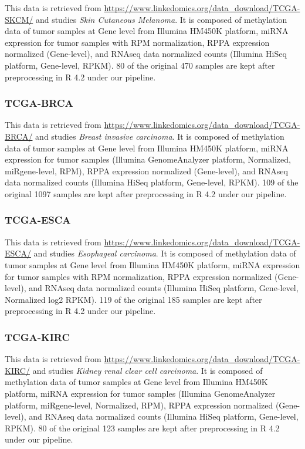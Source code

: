 \documentclass[
]{article}
\begin{document}
This data is retrieved from \url{https://www.linkedomics.org/data_download/TCGA-SKCM/} and studies \emph{Skin Cutaneous Melanoma}. It is composed of methylation data of tumor samples at Gene level from Illumina HM450K platform, miRNA expression for tumor samples with RPM normalization, RPPA expression normalized (Gene-level), and RNAseq data normalized counts (Illumina HiSeq platform, Gene-level, RPKM). 80 of the original 470 samples are kept after preprocessing in R 4.2 under our pipeline.

\hypertarget{tcga-brca}{%
\subsubsection{TCGA-BRCA}\label{tcga-brca}}

This data is retrieved from \url{https://www.linkedomics.org/data_download/TCGA-BRCA/} and studies \emph{Breast invasive carcinoma}. It is composed of methylation data of tumor samples at Gene level from Illumina HM450K platform, miRNA expression for tumor samples (Illumina GenomeAnalyzer platform, Normalized, miRgene-level, RPM), RPPA expression normalized (Gene-level), and RNAseq data normalized counts (Illumina HiSeq platform, Gene-level, RPKM). 109 of the original 1097 samples are kept after preprocessing in R 4.2 under our pipeline.

\hypertarget{tcga-esca}{%
\subsubsection{TCGA-ESCA}\label{tcga-esca}}

This data is retrieved from \url{https://www.linkedomics.org/data_download/TCGA-ESCA/} and studies \emph{Esophageal carcinoma}. It is composed of methylation data of tumor samples at Gene level from Illumina HM450K platform, miRNA expression for tumor samples with RPM normalization, RPPA expression normalized (Gene-level), and RNAseq data normalized counts (Illumina HiSeq platform, Gene-level, Normalized log2 RPKM). 119 of the original 185 samples are kept after preprocessing in R 4.2 under our pipeline.

\hypertarget{tcga-kirc}{%
\subsubsection{TCGA-KIRC}\label{tcga-kirc}}

This data is retrieved from \url{https://www.linkedomics.org/data_download/TCGA-KIRC/} and studies \emph{Kidney renal clear cell carcinoma}. It is composed of methylation data of tumor samples at Gene level from Illumina HM450K platform, miRNA expression for tumor samples (Illumina GenomeAnalyzer platform, miRgene-level, Normalized, RPM), RPPA expression normalized (Gene-level), and RNAseq data normalized counts (Illumina HiSeq platform, Gene-level, RPKM). 80 of the original 123 samples are kept after preprocessing in R 4.2 under our pipeline.
\end{document}
